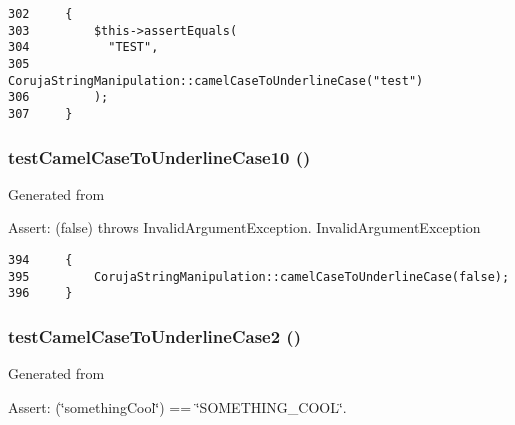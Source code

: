 \begin{Code}\begin{verbatim}302     {
303         $this->assertEquals(
304           "TEST",
305           CorujaStringManipulation::camelCaseToUnderlineCase("test")
306         );
307     }
\end{verbatim}
\end{Code}


\hypertarget{class_coruja_string_manipulation_test_eb3cfc94f9036a82f22dbad35e4696e4}{
\subsubsection[{testCamelCaseToUnderlineCase10}]{\setlength{\rightskip}{0pt plus 5cm}testCamelCaseToUnderlineCase10 ()}}
\label{class_coruja_string_manipulation_test_eb3cfc94f9036a82f22dbad35e4696e4}


Generated from \begin{Desc}
\item[Assert:](false) throws InvalidArgumentException.  InvalidArgumentException \end{Desc}


\begin{Code}\begin{verbatim}394     {
395         CorujaStringManipulation::camelCaseToUnderlineCase(false);
396     }
\end{verbatim}
\end{Code}


\hypertarget{class_coruja_string_manipulation_test_f81b71fb9c2990dcc730540ae42ae84b}{
\subsubsection[{testCamelCaseToUnderlineCase2}]{\setlength{\rightskip}{0pt plus 5cm}testCamelCaseToUnderlineCase2 ()}}
\label{class_coruja_string_manipulation_test_f81b71fb9c2990dcc730540ae42ae84b}


Generated from \begin{Desc}
\item[Assert:](\char`\"{}somethingCool\char`\"{}) == \char`\"{}SOMETHING\_\-COOL\char`\"{}. \end{Desc}


